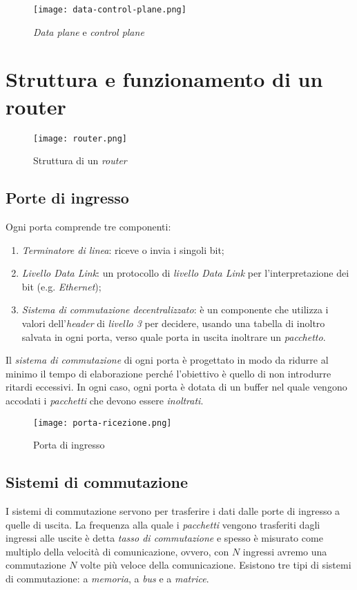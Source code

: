 \begin{figure}[ht]
    \centering
    \texttt{[image: data-control-plane.png]}
    \caption{\emph{Data plane} e \emph{control plane}}
\end{figure}
\newpage

\section{Struttura e funzionamento di un router}
\begin{figure}[h!]
    \centering
    \texttt{[image: router.png]}
    \caption{Struttura di un \emph{router}}
\end{figure}
\subsection{Porte di ingresso}
Ogni porta comprende tre componenti:
\begin{enumerate}
    \item \emph{Terminatore di linea}: riceve o invia i singoli bit;
    \item \emph{Livello Data Link}: un protocollo di \emph{livello Data Link}
    per l'interpretazione dei bit (e.g. \emph{Ethernet});
    \item \emph{Sistema di commutazione decentralizzato}: è un componente che
    utilizza i valori dell'\emph{header} di \emph{livello 3} per decidere,
    usando una tabella di inoltro salvata in ogni porta, verso quale porta in
    uscita inoltrare un \emph{pacchetto}.
\end{enumerate}
Il \emph{sistema di commutazione} di ogni porta è progettato in modo da
ridurre al minimo il tempo di elaborazione perché l'obiettivo è quello di non
introdurre ritardi eccessivi. In ogni caso, ogni porta è dotata di un buffer nel
quale vengono accodati i \emph{pacchetti} che devono essere \emph{inoltrati}.

\begin{figure}[h!]
    \centering
    \texttt{[image: porta-ricezione.png]}
    \caption{Porta di ingresso}
\end{figure}

\subsection{Sistemi di commutazione}
I sistemi di commutazione servono per trasferire i dati dalle porte di ingresso
a quelle di uscita. La frequenza alla quale i \emph{pacchetti} vengono trasferiti
dagli ingressi alle uscite è detta \emph{tasso di commutazione} e spesso è
misurato come multiplo della velocità di comunicazione, ovvero, con $N$ ingressi
avremo una commutazione $N$ volte più veloce della comunicazione.
Esistono tre tipi di sistemi di commutazione: a \emph{memoria}, a \emph{bus} e
a \emph{matrice}.

